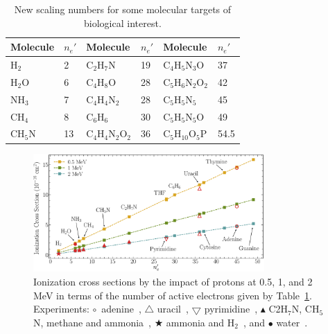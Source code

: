 \documentclass[10pt,showpacs,twocolumn]{revtex4}
\begin{document}
\begin{table}[t]
\begin{center}
\begin{tabular}{|p{}p{}|
p{}p{}|p{}p{}|}
\hline
 Molecule & $n_e'$ &Molecule          & $n_e'$ & Molecule             & $n_e'$\\
\hline
 H$_2$    & 2  & C$_2$H$_7$N         & 19    & C$_4$H$_5$N$_3$O     & 37   \\
 H$_2$O   & 6  & C$_4$H$_8$O         & 28    & C$_5$H$_6$N$_2$O$_2$ & 42   \\
 NH$_3$   & 7  & C$_4$H$_4$N$_2$     & 28    & C$_5$H$_5$N$_5$      & 45   \\
 CH$_4$   & 8  & C$_6$H$_6$          & 30    & C$_5$H$_5$N$_5$O     & 49   \\
 CH$_5$N  & 13 & C$_4$H$_4$N$_2$O$_2$& 36    & C$_5$H$_{10}$O$_5$P  & 54.5 \\
 \hline
\end{tabular}
\caption{New scaling numbers for some molecular targets of biological 
interest.}
\label{nn}
\end{center}
\end{table}

\begin{figure}[t!]
\centering
\includegraphics[width=0.785\textwidth]{scale_ne.eps}
\caption{Ionization cross sections by the impact of protons at 0.5, 1,
and 2 MeV in terms of the number of active electrons given by Table~\ref{nn}.
Experiments: 
\mbox{\Large$\circ$}~adenine~\cite{iriki2011}, 
$\triangle$ uracil~\cite{itoh2013}, 
$\bigtriangledown$ pyrimidine~\cite{wolff2014}, 
$\blacktriangle$ C2H$_7$N, CH$_5$N, methane and ammonia~\cite{lynch1976},
\mbox{\scriptsize$\bigstar$} ammonia and H$_2$~\cite{rudd1985}, and 
\mbox{\Large$\bullet$} water~\cite{luna2007}.}
\label{fig:recta}
\end{figure}
\end{document}
